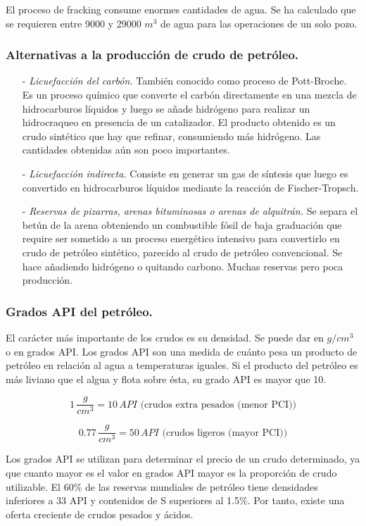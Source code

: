 				El proceso de fracking consume enormes cantidades de agua. Se ha calculado que se requieren entre 9000 y 29000 $m^3$ de agua para las operaciones de un solo pozo.
				
		\subsubsection{Alternativas a la producción de crudo de petróleo.}
			\begin{itemize}
				\item[-] \textit{Licuefacción del carbón.}
					También conocido como proceso de Pott-Broche. Es un proceso químico que converte el carbón directamente en una mezcla de hidrocarburos líquidos y luego se añade hidrógeno para realizar un hidrocraqueo en presencia de un catalizador. El producto obtenido es un crudo sintético que hay que refinar, consumiendo más hidrógeno. Las cantidades obtenidas aún son poco importantes.
				\item[-] \textit{Licuefacción indirecta.}
					Consiste en generar un gas de síntesis que luego es convertido en hidrocarburos líquidos mediante la reacción de Fischer-Tropsch.
				\item[-] \textit{Reservas de pizarras, arenas bituminosas o arenas de alquitrán.}
					Se separa el betún de la arena obteniendo un combustible fósil de baja graduación que require ser sometido a un proceso energético intensivo para convertirlo en crudo de petróleo sintético, parecido al crudo de petróleo convencional. Se hace añadiendo hidrógeno o quitando carbono. Muchas reservas pero poca producción.
			\end{itemize}
			
		\subsubsection{Grados API del petróleo.}
			El carácter más importante de los crudos es su densidad. Se puede dar en $g/cm^3$ o en grados API. Los grados API son una medida de cuánto pesa un producto de petróleo en relación al agua a temperaturas iguales. Si el producto del petróleo es más liviano que el algua y flota sobre ésta, su grado API es mayor que 10.
			
			
			\[1\,\dfrac{g}{cm^3} = 10\,API \text{ (crudos extra pesados (menor PCI))}\]
			
			\[0.77\,\dfrac{g}{cm^3} = 50\,API \text{ (crudos ligeros (mayor PCI))}\]
			
			
			Los grados API se utilizan para determinar el precio de un crudo determinado, ya que cuanto mayor es el valor en grados API mayor es la proporción de crudo utilizable. El 60\% de las reservas mundiales de petróleo tiene densidades inferiores a 33 API y contenidos de S superiores al 1.5\%. Por tanto, existe una oferta creciente de crudos pesados y ácidos.
			
